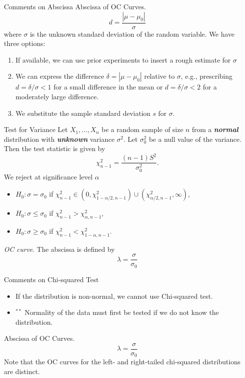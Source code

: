 \documentclass{beamer}
\newcommand{\bb}[1]{\textcolor{antiquefuchsia}{\textbf{\textit{#1}}}}
\begin{document}
\begin{frame}{Comments on Abscissa}
Abscissa of OC Curves.
$$
d=\frac{\left|\mu-\mu_{0}\right|}{\sigma}
$$
where $\sigma$ is the unknown standard deviation of the random variable. We have three options:
\begin{enumerate}
\item If available, we can use prior experiments to insert a rough estimate for $\sigma$
\item We can express the difference $\delta=\left|\mu-\mu_{0}\right|$ relative to $\sigma$, e.g., prescribing $d=\delta / \sigma<1$ for a small difference in the mean or $d=\delta / \sigma<2$ for a moderately large difference.
\item We substitute the sample standard deviation $s$ for $\sigma$.
\end{enumerate}
\end{frame}

\begin{frame}{Test for Variance}
Let $X_{1}, \ldots, X_{n}$ be a random sample of size $n$ from a \bb{normal} distribution with \bb{unknown} variance $\sigma^{2}$. Let $\sigma_{0}^{2}$ be a null value of the variance. Then the test statistic is given by
$$
\chi_{n-1}^{2}=\frac{(n-1) S^{2}}{\sigma_{0}^{2}} .
$$
We reject at significance level $\alpha$
\begin{itemize}
\item $H_{0}: \sigma=\sigma_{0}$ if $\chi_{n-1}^{2} \in\left(0, \chi_{1-\alpha / 2, n-1}^{2}\right) \cup\left(\chi_{\alpha / 2, n-1}^{2}, \infty\right)$,
\item $H_{0}: \sigma \leq \sigma_{0}$ if $\chi_{n-1}^{2}>\chi_{\alpha, n-1}^{2}$,
\item $H_{0}: \sigma \geq \sigma_{0}$ if $\chi_{n-1}^{2}<\chi_{1-\alpha, n-1}^{2}$.
\end{itemize}
\textit{OC curve}. The abscissa is defined by
$$
\lambda=\frac{\sigma}{\sigma_{0}}
$$
\end{frame}

\begin{frame}{Comments on Chi-squared Test}
\begin{itemize}
\item If the distribution is non-normal, we cannot use Chi-squared test.
\item ${ }^{* *}$ Normality of the data must first be tested if we do not know the distribution.
\end{itemize}
Abscissa of OC Curves.
$$
\lambda=\frac{\sigma}{\sigma_{0}}
$$
Note that the OC curves for the left- and right-tailed chi-squared distributions are distinct.
\end{frame}
\end{document}
